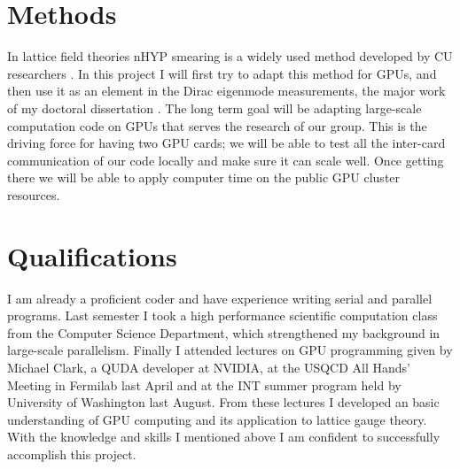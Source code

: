 \documentclass[11pt]{article}
\begin{document}
   \section*{Methods} %
  In lattice field theories nHYP smearing is a widely used method developed by CU researchers \cite{nHYP1,nHYP2,nHYP3}. 
  In this project I will first try to adapt this method for GPUs, and then use it as an element in the Dirac eigenmode measurements, the major work of my doctoral dissertation \cite{paper1, paper2, paper3}. The long term goal will be adapting large-scale computation code on GPUs that serves the research of our group. This is the driving force for having two GPU cards; we will be able to test all the inter-card communication of our code locally and make sure it can scale well. Once getting there we will be able to apply computer time on the public GPU cluster resources. 
    
  \section*{Qualifications} %
  I am already a proficient coder and have experience writing serial and parallel programs.
  Last semester I took a high performance scientific computation class from the Computer Science Department, which strengthened my background in large-scale parallelism.
  Finally I attended lectures on GPU programming given by Michael Clark, a QUDA developer at NVIDIA, at the USQCD All Hands' Meeting in Fermilab last April and at the INT summer program held by University of Washington last August. 
  From these lectures I developed an basic understanding of GPU computing and its application to lattice gauge theory. 
  With the knowledge and skills I mentioned above I am confident to successfully accomplish this project.
\end{document}
